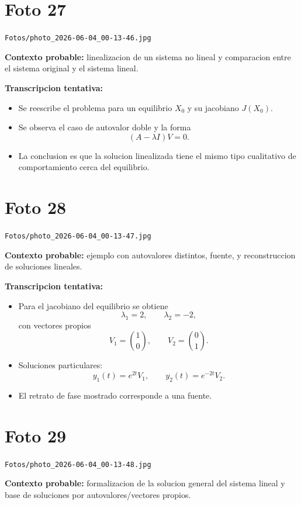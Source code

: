 \documentclass[11pt,letterpaper]{article}
\begin{document}
\section*{Foto 27}
\texttt{Fotos/photo\_2026-06-04\_00-13-46.jpg}

\textbf{Contexto probable:} linealizacion de un sistema no lineal y comparacion entre el sistema original y el sistema lineal.

\textbf{Transcripcion tentativa:}
\begin{itemize}[leftmargin=*]
    \item Se reescribe el problema para un equilibrio \(X_0\) y su jacobiano \(J(X_0)\).
    \item Se observa el caso de autovalor doble y la forma
    \[
    (A-\lambda I)V=0.
    \]
    \item La conclusion es que la solucion linealizada tiene el mismo tipo cualitativo de comportamiento cerca del equilibrio.
\end{itemize}

\section*{Foto 28}
\texttt{Fotos/photo\_2026-06-04\_00-13-47.jpg}

\textbf{Contexto probable:} ejemplo con autovalores distintos, fuente, y reconstruccion de soluciones lineales.

\textbf{Transcripcion tentativa:}
\begin{itemize}[leftmargin=*]
    \item Para el jacobiano del equilibrio se obtiene
    \[
    \lambda_1=2,\qquad \lambda_2=-2,
    \]
    con vectores propios
    \[
    V_1=\binom{1}{0},\qquad V_2=\binom{0}{1}.
    \]
    \item Soluciones particulares:
    \[
    y_1(t)=e^{2t}V_1,\qquad y_2(t)=e^{-2t}V_2.
    \]
    \item El retrato de fase mostrado corresponde a una fuente.
\end{itemize}

\section*{Foto 29}
\texttt{Fotos/photo\_2026-06-04\_00-13-48.jpg}

\textbf{Contexto probable:} formalizacion de la solucion general del sistema lineal y base de soluciones por autovalores/vectores propios.
\end{document}
